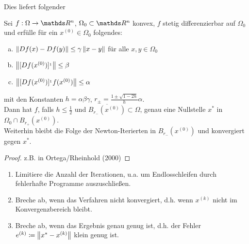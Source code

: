 Dies liefert folgender
\begin{satz}
  Sei $f:\Omega\rightarrow \Ren$, $\Omega_0 \subset \Ren$ konvex,
  $f$ stetig differenzierbar auf $\Omega_0$ und 
  erfülle für ein $x^{(0)}\in \Omega_0$ folgendes:
  \begin{enumerate}[a)]
  \item $\left\| Df(x) -Df(y) \right\|\leq \gamma \left\| x-y \right\|$ für alle $x,y\in \Omega_0$
  \item $\left\| [Df(x^{(0)})]^{_1} \right\| \leq \beta$
  \item $\left\| [Df(x^{(0)})]^{_1}f(x^{(0)}) \right\| \leq \alpha$
  \end{enumerate}
  mit den Konstanten $h=\alpha\beta\gamma$, $r_\pm = \frac{1\pm \sqrt{1-2h}}{h}\alpha$.\\
  Dann hat $f$, falls $h\leq \frac{1}{2}$ und $\overline{B_{r_{-}}(x^{(0)})}\subset \Omega$,
  genau eine Nullstelle $x^{*}$ in $\Omega_0\cap B_{r_+}(x^{(0)})$.\\
  Weiterhin bleibt die Folge der Newton-Iterierten in $B_{r_{-}}(x^{(0)})$
  und konvergiert gegen $x^{*}$.
  \begin{proof}
    z.B. in Ortega/Rheinhold (2000)
  \end{proof}
\end{satz}


\begin{enumerate}[1)]
\item Limitiere die Anzahl der Iterationen, u.a. um 
  Endlosschleifen durch fehlerhafte Programme auszuschließen.
\item Breche ab, wenn das Verfahren nicht konvergiert, d.h.
  wenn $x^{(k)}$ nicht im Konvergenzbereich bleibt.
\item Breche ab, wenn das Ergebnis genau genug ist, d.h. der
  Fehler $e^{(k)}\coloneqq \left\| x^{*}-x^{(k)} \right\|$ klein genug ist.
\end{enumerate}


